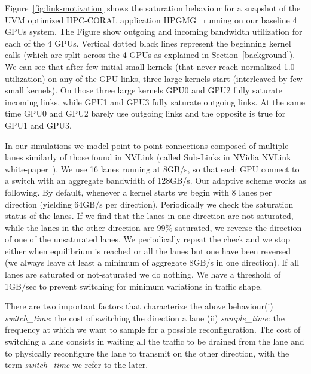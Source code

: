 Figure~\ref{fig:link-motivation} shows the saturation behaviour for a 
snapshot of the UVM optimized HPC-CORAL application 
HPGMG~\cite{adams2014hpgmg} running on our baseline 4 GPUs system. The Figure 
show outgoing and incoming bandwidth utilization for each of the 4 GPUs. 
Vertical dotted black lines represent the beginning kernel calls (which are 
split across the 4 GPUs as explained in Section~\ref{background}). We can see 
that after few initial small kernels (that never reach normalized 1.0 utilization) on any 
of the GPU links, three large kernels start (interleaved by few small 
kernels). On those three large kernels GPU0 and GPU2 fully saturate incoming 
links, while GPU1 and GPU3 fully saturate outgoing links. At the same time 
GPU0 and GPU2 barely use outgoing links and the opposite is true for GPU1 and 
GPU3.

In our simulations we model point-to-point connections composed of multiple 
lanes similarly of those found in NVLink (called Sub-Links in NVidia NVLink 
white-paper~\cite{pascal-tesla-wp}). We use 16 lanes running at 8GB/s, so 
that each GPU connect to a switch with an aggregate bandwidth of 128GB/s. 
Our adaptive scheme works as following. By default, whenever a kernel starts 
we begin with 8 lanes per direction (yielding 64GB/s per direction). 
Periodically we check the saturation status of the lanes. If we find that 
the lanes in one direction are not saturated, while the lanes in the other 
direction are 99\% saturated, we reverse the direction of one of the 
unsaturated lanes. We periodically repeat the check and we stop either when 
equilibrium is reached or all the lanes but one have been reversed (we always 
leave at least a minimum of aggregate 8GB/s in one direction). If all 
lanes are saturated or not-saturated we do nothing. We have a threshold of 
1GB/sec to prevent switching for minimum variations in traffic shape.

There are two important factors that characterize the above behaviour(i) 
\emph{switch\_time}: the cost of switching the direction a lane (ii) 
\emph{sample\_time}: the frequency at which we want to sample for a possible 
reconfiguration. The cost of switching a lane consists in waiting all 
the traffic to be drained from the lane and to physically reconfigure the 
lane to transmit on the other direction, with the term \emph{switch\_time} we 
refer to the later. 



